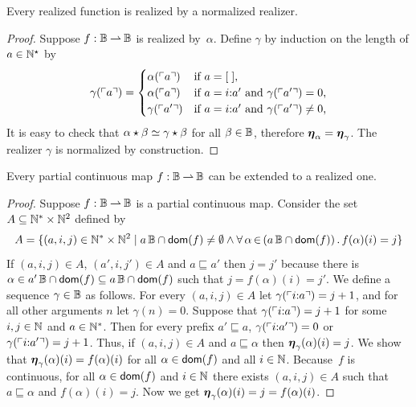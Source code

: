 \begin{lemma}
  \label{lemma:normalized-BB}%
  Every realized function is realized by a normalized realizer.
\end{lemma}

\begin{proof}
  Suppose $f : \mathbb{B} \mathbin{\rightharpoonup} \mathbb{B}$ is realized by~$\alpha$. Define
  $\gamma$ by induction on the length of $a \in \mathbb{N}^{\star}$ by
  \begin{equation*}
    \gamma(\ulcorner a \urcorner) =
    \begin{cases}
      \alpha(\ulcorner a \urcorner) & \text{if $a = [\;]$,}\\
      \alpha(\ulcorner a \urcorner) & \text{if $a = i {:} a'$ and
        $\gamma(\ulcorner a' \urcorner) = 0$,}\\
      \gamma(\ulcorner a' \urcorner) & \text{if $a = i {:} a'$ and
        $\gamma(\ulcorner a' \urcorner) \neq 0$,}
    \end{cases}
  \end{equation*}
  It is easy to check that $\alpha \star \beta \simeq \gamma \star
  \beta$ for all $\beta \in \mathbb{B}$, therefore $\text{\boldmath{$\eta$}}_\alpha =
  \text{\boldmath{$\eta$}}_\gamma$. The realizer $\gamma$ is normalized by construction.
\end{proof}


\begin{theorem}%
  \label{th:extension_BB}%
  Every partial continuous map $f: \mathbb{B} \mathbin{\rightharpoonup} \mathbb{B}$ can be extended
  to a realized one.
\end{theorem}

\begin{proof}
  Suppose $f: \mathbb{B} \mathbin{\rightharpoonup} \mathbb{B}$ is a partial continuous map.  Consider
  the set $A \subseteq \mathbb{N}^{*} \times \mathbb{N}^2$ defined by
  \begin{equation*}
     A = \set{(a, i, j) \in \NN^{*} \times \NN^{2} \such
        \basicBB{a} \cap \dom{f} \neq \emptyset \land
        \xall{\alpha}{(\basicBB{a} \cap \dom{f})}{
          f(\alpha)(i) = j
          }
        }
  \end{equation*}
  If $(a, i, j) \in A$, $(a', i, j') \in A$ and $a \sqsubseteq a'$
  then $j = j'$ because there is $\alpha \in a'\,\mathbb{B} \cap
  \mathsf{dom}(f) \subseteq a\,\mathbb{B} \cap \mathsf{dom}(f)$ such that $j =
  f(\alpha)(i) = j'$. We define a sequence $\gamma \in \mathbb{B}$ as
  follows. For every $(a, i, j) \in A$ let
  $\gamma(\ulcorner i {:} a \urcorner) = j + 1$, and for all other
  arguments $n$ let $\gamma(n) = 0$. Suppose that
  $\gamma(\ulcorner i {:} a \urcorner) = j + 1$ for some $i, j \in \mathbb{N}$
  and $a \in \mathbb{N}^{*}$. Then for every prefix $a' \sqsubseteq a$,
  $\gamma(\ulcorner i {:} a' \urcorner) = 0$ or
  $\gamma(\ulcorner i {:} a' \urcorner) = j + 1$. Thus, if $(a, i, j) \in
  A$ and $a \sqsubseteq \alpha$ then $\text{\boldmath{$\eta$}}_{\gamma}(\alpha)(i) = j$.
  We show that $\text{\boldmath{$\eta$}}_{\gamma}(\alpha)(i) = f(\alpha)(i)$ for all
  $\alpha \in \mathsf{dom}(f)$ and all $i \in \mathbb{N}$. Because~$f$ is continuous,
  for all $\alpha \in \mathsf{dom}(f)$ and $i \in \mathbb{N}$ there exists $(a, i, j)
  \in A$ such that $a \sqsubseteq \alpha$ and $f(\alpha)(i) = j$. Now
  we get
  $
    \text{\boldmath{$\eta$}}_{\gamma}(\alpha)(i)
    = j
    = f(\alpha)(i)
  $.
\end{proof}

